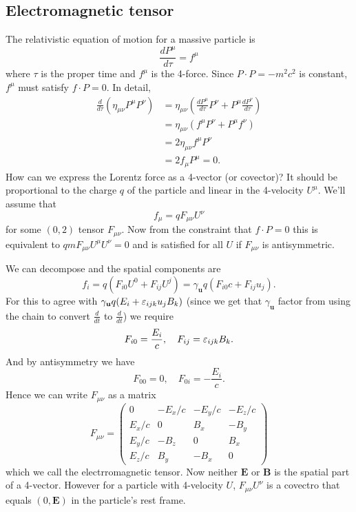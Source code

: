 \documentclass{article}
\begin{document}
\subsection{Electromagnetic tensor}
The relativistic equation of motion for a massive particle is
\[
	\frac{dP^\mu}{d\tau} = f^\mu
\]
where $ \tau $ is the proper time and $ f^\mu $ is the 4-force. Since $ P\cdot P = -m^2c^2 $ is constant, $ f^\mu $ must satisfy $ f\cdot P = 0 $. In detail,
\begin{align*}
	\frac{d}{d\tau}\left(\eta_{\mu\nu}P^\mu P^\nu\right) &= \eta_{\mu\nu}\left(\frac{dP^\mu}{d\tau} P^\nu + P^\mu \frac{dP^\nu}{d\tau}\right) \\
							     &= \eta_{\mu\nu}(f^\mu P^\nu + P^\mu f^\nu) \\
							     &= 2 \eta_{\mu\nu} f^\mu P^\nu \\
							     &= 2f_\mu P^\mu = 0.
\end{align*}
How can we express the Lorentz force as a 4-vector (or covector)? It should be proportional to the charge $ q $ of the particle and linear in the 4-velocity $ U^\mu $. We'll assume that
\[
	f_\mu = qF_{\mu\nu}U^\nu
\]
for some $ (0,2) $ tensor $ F_{\mu\nu} $. Now from the constraint that $ f\cdot P = 0 $ this is equivalent to $ qmF_{\mu \nu} U^\mu U^\nu = 0 $ and is satisfied for all $ U $ if $ F_{\mu\nu} $ is antisymmetric.\par
We can decompose and the spatial components are
\[
	f_i = q(F_{i0}U^0 + F_{ij}U^j) = \gamma_{\mathbf u} q(F_{i0}c + F_{ij}u_j).
\]
For this to agree with $ \gamma_{\mathbf u}q(E_i+\varepsilon_{ijk}u_jB_k) $ (since we get that $ \gamma_{\mathbf u} $ factor from using the chain to convert $ \frac{d}{dt} $ to $ \frac{d}{dt} $) we require
\[
	F_{i0} = \frac{E_i}c,\quad F_{ij} = \varepsilon_{ijk}B_k.
\]
And by antisymmetry we have
\[
	F_{00} = 0, \quad F_{0i} = - \frac{E_i}c.
\]
Hence we can write $ F_{\mu\nu} $ as a matrix
\[
	F_{\mu\nu} = \begin{pmatrix}
		0 & - E_x/c & -E_y/c & -E_z/c \\
		E_x/c & 0 & B_x & -B_y \\
		E_y/c & -B_z & 0 & B_x \\
		E_z/c & B_y & -B_x & 0
	\end{pmatrix}
\]
which we call the electrromagnetic tensor. Now neither $ \mathbf E $ or $ \mathbf B $ is the spatial part of a 4-vector. However for a particle with 4-velocity $ U $, $ F_{\mu\nu}U^\nu $ is a covectro that equals $ (0,\mathbf E) $ in the particle's rest frame.\par
\end{document}
